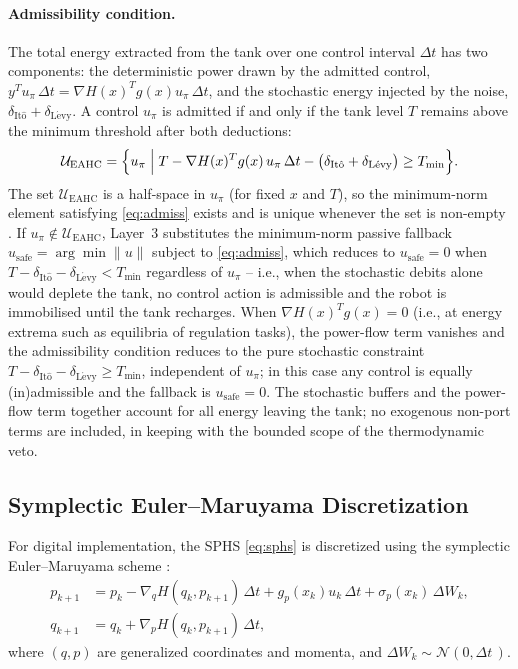 \documentclass[11pt]{article}
\begin{document}
\paragraph{Admissibility condition.} The total energy extracted from the tank over one control
interval $\Delta t$ has two components: the deterministic power drawn by the admitted control,
$y^T u_\pi\,\Delta t=\nabla H(x)^T g(x)u_\pi\,\Delta t$, and the stochastic energy injected by
the noise, $\delta_{\mathrm{It\hat{o}}}+\delta_{\mathrm{L\acute{e}vy}}$. A control $u_\pi$
is admitted if and only if the tank level $T$ remains above the minimum threshold after both
deductions:
\begin{equation}
\mathcal{U}_{\mathrm{EAHC}} = \Bigl\{u_\pi \;\Big|\;
  T - \nabla H(x)^T g(x)\,u_\pi\,\Delta t
  - \bigl(\delta_{\mathrm{It\hat{o}}}+\delta_{\mathrm{L\acute{e}vy}}\bigr)\ge T_{\min}\Bigr\}.
\label{eq:admiss}
\end{equation}
The set $\mathcal{U}_{\mathrm{EAHC}}$ is a half-space in $u_\pi$ (for fixed $x$ and $T$), so
the minimum-norm element satisfying \eqref{eq:admiss} exists and is unique whenever the set
is non-empty \cite{ferraguti2013}. If $u_\pi\notin\mathcal{U}_{\mathrm{EAHC}}$, Layer~3
substitutes the minimum-norm passive fallback
$u_{\mathrm{safe}}=\arg\min\|u\|$ subject to \eqref{eq:admiss}, which reduces to
$u_{\mathrm{safe}}=0$ when $T-\delta_{\mathrm{It\hat{o}}}-\delta_{\mathrm{L\acute{e}vy}}<T_{\min}$
regardless of $u_\pi$ -- i.e., when the stochastic debits alone would deplete the tank, no
control action is admissible and the robot is immobilised until the tank recharges. When
$\nabla H(x)^T g(x)=0$ (i.e., at energy extrema such as equilibria of regulation tasks), the
power-flow term vanishes and the admissibility condition reduces to the pure stochastic
constraint $T-\delta_{\mathrm{It\hat{o}}}-\delta_{\mathrm{L\acute{e}vy}}\ge T_{\min}$,
independent of $u_\pi$; in this case any control is equally (in)admissible and the fallback is
$u_{\mathrm{safe}}=0$. The stochastic buffers and the power-flow term together account for all
energy leaving the tank; no exogenous non-port terms are included, in keeping with the bounded
scope of the thermodynamic veto.

\subsection{Symplectic Euler--Maruyama Discretization}
\label{sec:symplectic}

For digital implementation, the SPHS \eqref{eq:sphs} is discretized using the symplectic
Euler--Maruyama scheme \cite{milstein1995,leimkuhler2004}:
\begin{equation}
\begin{aligned}
p_{k+1} &= p_k - \nabla_q H(q_k, p_{k+1})\,\Delta t
           + g_p(x_k)u_k\,\Delta t + \sigma_p(x_k)\,\Delta W_k,\\
q_{k+1} &= q_k + \nabla_p H(q_k, p_{k+1})\,\Delta t,
\end{aligned}
\label{eq:sym-EM}
\end{equation}
where $(q,p)$ are generalized coordinates and momenta, and $\Delta W_k\sim\mathcal{N}(0,\Delta t\,)$.
\end{document}
